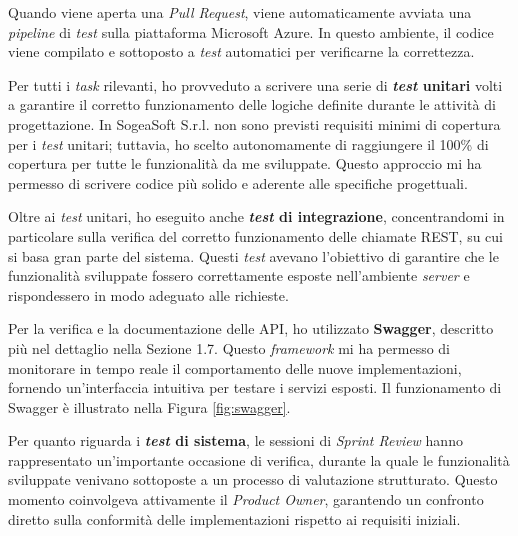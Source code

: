         \vspace{0.2 em}
        \noindent Quando viene aperta una \textit{Pull Request}, viene automaticamente avviata una \textit{pipeline} di \textit{test} sulla piattaforma Microsoft Azure. In questo ambiente, il codice viene compilato e sottoposto a \textit{test} automatici per verificarne la correttezza.  

        \vspace{0.2 em}
        \noindent Per tutti i \textit{task} rilevanti, ho provveduto a scrivere una serie di \textbf{\textit{test} unitari} volti a garantire il corretto funzionamento delle logiche definite durante le attività di progettazione. In SogeaSoft S.r.l. non sono previsti requisiti minimi di copertura per i \textit{test} unitari; tuttavia, ho scelto autonomamente di raggiungere il 100\% di copertura per tutte le funzionalità da me sviluppate. Questo approccio mi ha permesso di scrivere codice più solido e aderente alle specifiche progettuali.

        \vspace{0.2 em}
        \noindent Oltre ai \textit{test} unitari, ho eseguito anche \textbf{\textit{test} di integrazione}, concentrandomi in particolare sulla verifica del corretto funzionamento delle chiamate REST, su cui si basa gran parte del sistema. Questi \textit{test} avevano l'obiettivo di garantire che le funzionalità sviluppate fossero correttamente esposte nell'ambiente \textit{server} e rispondessero in modo adeguato alle richieste.  

        \vspace{0.2 em}
        \noindent Per la verifica e la documentazione delle API, ho utilizzato \textbf{Swagger}, descritto più nel dettaglio nella Sezione 1.7. Questo \textit{framework} mi ha permesso di monitorare in tempo reale il comportamento delle nuove implementazioni, fornendo un'interfaccia intuitiva per testare i servizi esposti. Il funzionamento di Swagger è illustrato nella Figura \ref{fig:swagger}.  

        \vspace{0.2 em}
        \noindent Per quanto riguarda i \textbf{\textit{test} di sistema}, le sessioni di \textit{Sprint Review} hanno rappresentato un'importante occasione di verifica, durante la quale le funzionalità sviluppate venivano sottoposte a un processo di valutazione strutturato. Questo momento coinvolgeva attivamente il \textit{Product Owner}, garantendo un confronto diretto sulla conformità delle implementazioni rispetto ai requisiti iniziali.  

